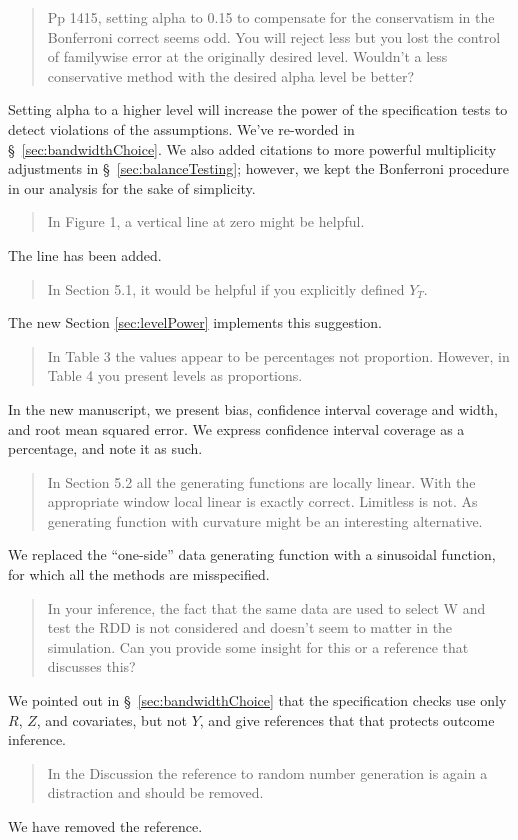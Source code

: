 \documentclass[12pt]{article}
\begin{document}
\begin{quote}
Pp 14­15, setting alpha to 0.15 to compensate for the conservatism in
the Bonferroni correct seems odd. You will reject less but you lost
the control of familywise error at the originally desired
level. Wouldn’t a less conservative method with the desired alpha
level be better?
\end{quote}
Setting alpha to a higher level will increase the power of the
specification tests to detect violations of the assumptions. We've
re-worded in \S~\ref{sec:bandwidthChoice}.
We also added citations to more powerful multiplicity adjustments in
\S~\ref{sec:balanceTesting}; however, we kept the Bonferroni procedure
in our analysis for the sake of simplicity.

\begin{quote}
In Figure 1, a vertical line at zero might be helpful.
\end{quote}
The line has been added.

\begin{quote}
In Section 5.1, it would be helpful if you explicitly defined $Y_T$.
\end{quote}
The new Section \ref{sec:levelPower} implements this suggestion.

\begin{quote}
In Table 3 the values appear to be percentages not proportion. However,
in Table 4 you present levels as proportions.
\end{quote}
In the new manuscript, we present bias, confidence interval coverage
and width, and root mean squared error. We express confidence interval
coverage as a percentage, and note it as such.

\begin{quote}
In Section 5.2 all the
generating functions are locally linear. With the appropriate window
local linear is exactly correct. Limitless is not. As generating
function with curvature might be an interesting alternative.
\end{quote}
We replaced the ``one-side'' data generating function with a
sinusoidal function, for which all the methods are misspecified.

\begin{quote}
In your inference, the fact that the same data are used to select W
and test the RDD is not considered and doesn’t seem to matter in the
simulation. Can you provide some insight for this or a reference that
discusses this?
\end{quote}
We pointed out in \S~\ref{sec:bandwidthChoice} that the specification
checks use only $R$, $Z$, and covariates, but not $Y$, and give
references that that protects outcome inference.

\begin{quote}
In the Discussion the reference to random number generation is again a
distraction and should be removed.
\end{quote}
We have removed the reference.
\end{document}
